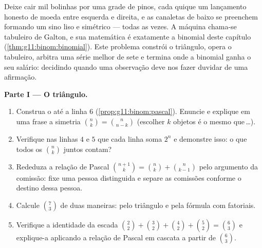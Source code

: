 \begin{problem}
\label{pb:g11:binom:1}
Deixe cair mil bolinhas por uma grade de pinos, cada quique um
lançamento honesto de moeda entre esquerda e direita, e as
canaletas de baixo se preenchem formando um sino liso e simétrico
--- todas as vezes. A máquina chama-se tabuleiro de Galton, e sua
matemática é exatamente a  binomial deste capítulo
(\cref{thm:g11:binom:binomial}). Este problema constrói o
triângulo, opera o tabuleiro, arbitra uma série melhor de sete e
termina onde a binomial ganha o seu salário: decidindo quando uma
observação deve nos fazer duvidar de uma afirmação.

\medskip
\noindent\textbf{Parte I --- O triângulo.}
\begin{enumerate}
  \item Construa o  até a linha $6$
        (\cref{prop:g11:binom:pascal}). Enuncie e explique em uma
        frase a simetria $\binom nk = \binom{n}{n-k}$ (escolher
        $k$ objetos é o mesmo que\,\dots).
  \item Verifique nas linhas $4$ e $5$ que cada linha soma $2^n$
        e demonstre isso: o que todos os $\binom nk$ juntos
        contam?
  \item Rededuza a relação de Pascal
        $\binom{n+1}{k} = \binom nk + \binom{n}{k-1}$ pelo
        argumento da comissão: fixe uma pessoa distinguida e
        separe as comissões conforme o destino dessa pessoa.
  \item Calcule $\binom73$ de duas maneiras: pelo triângulo e
        pela fórmula com fatoriais.
  \item Verifique a identidade da escada
        $\binom22 + \binom32 + \binom42 + \binom52 = \binom63$ e
        explique-a aplicando a relação de Pascal em cascata a
        partir de $\binom63$.
\end{enumerate}


\end{problem}
